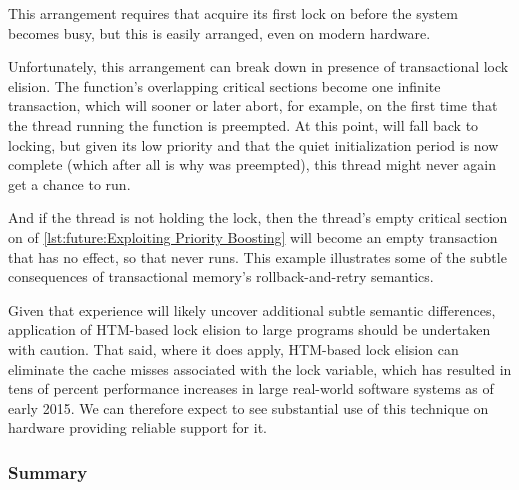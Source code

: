 \begin{fcvref}
This arrangement requires that  acquire its first
lock on  before the system becomes busy, but this is easily
arranged, even on modern hardware.

Unfortunately, this arrangement can break down in presence of transactional
lock elision.
The  function's overlapping critical sections become
one infinite transaction, which will sooner or later abort,
for example, on the first time that the thread running
the  function is preempted.
At this point,  will fall back to locking, but given
its low priority and that the quiet initialization period is now
complete (which after all is why  was preempted),
this thread might never again get a chance to run.

And if the  thread is not holding the lock, then
the  thread's empty critical section on  of
\cref{lst:future:Exploiting Priority Boosting}
will become an empty transaction that has no effect, so that
 never runs.
This example illustrates some of the subtle consequences of
transactional memory's rollback-and-retry semantics.
\end{fcvref}

Given that experience will likely uncover additional subtle semantic
differences, application of HTM-based lock elision to large programs
should be undertaken with caution.
That said, where it does apply, HTM-based lock elision can eliminate
the cache misses associated with the lock variable, which has resulted
in tens of percent performance increases in large real-world software
systems as of early 2015.
We can therefore expect to see substantial use of this technique on
hardware providing reliable support for it.

\QuickQuizEnd

\subsubsection{Summary}
\label{sec:future:HTM Weaknesses WRT Locking: Summary}

